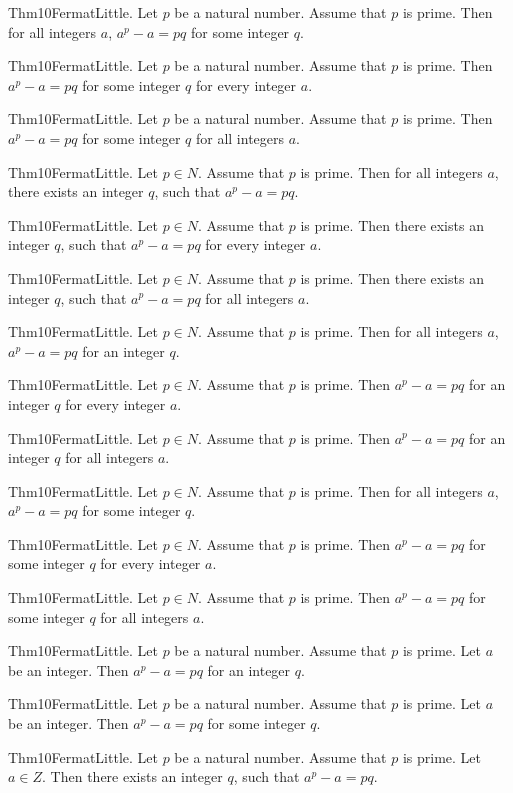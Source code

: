 \documentclass{article}
\begin{document}
Thm10FermatLittle. Let $p$ be a natural number. Assume that $p$ is prime. Then for all integers $a$, $a ^ {p}- a = p q$ for some integer $q$.

Thm10FermatLittle. Let $p$ be a natural number. Assume that $p$ is prime. Then $a ^ {p}- a = p q$ for some integer $q$ for every integer $a$.

Thm10FermatLittle. Let $p$ be a natural number. Assume that $p$ is prime. Then $a ^ {p}- a = p q$ for some integer $q$ for all integers $a$.

Thm10FermatLittle. Let $p \in N$. Assume that $p$ is prime. Then for all integers $a$, there exists an integer $q$, such that $a ^ {p}- a = p q$.

Thm10FermatLittle. Let $p \in N$. Assume that $p$ is prime. Then there exists an integer $q$, such that $a ^ {p}- a = p q$ for every integer $a$.

Thm10FermatLittle. Let $p \in N$. Assume that $p$ is prime. Then there exists an integer $q$, such that $a ^ {p}- a = p q$ for all integers $a$.

Thm10FermatLittle. Let $p \in N$. Assume that $p$ is prime. Then for all integers $a$, $a ^ {p}- a = p q$ for an integer $q$.

Thm10FermatLittle. Let $p \in N$. Assume that $p$ is prime. Then $a ^ {p}- a = p q$ for an integer $q$ for every integer $a$.

Thm10FermatLittle. Let $p \in N$. Assume that $p$ is prime. Then $a ^ {p}- a = p q$ for an integer $q$ for all integers $a$.

Thm10FermatLittle. Let $p \in N$. Assume that $p$ is prime. Then for all integers $a$, $a ^ {p}- a = p q$ for some integer $q$.

Thm10FermatLittle. Let $p \in N$. Assume that $p$ is prime. Then $a ^ {p}- a = p q$ for some integer $q$ for every integer $a$.

Thm10FermatLittle. Let $p \in N$. Assume that $p$ is prime. Then $a ^ {p}- a = p q$ for some integer $q$ for all integers $a$.

Thm10FermatLittle. Let $p$ be a natural number. Assume that $p$ is prime. Let $a$ be an integer. Then $a ^ {p}- a = p q$ for an integer $q$.

Thm10FermatLittle. Let $p$ be a natural number. Assume that $p$ is prime. Let $a$ be an integer. Then $a ^ {p}- a = p q$ for some integer $q$.

Thm10FermatLittle. Let $p$ be a natural number. Assume that $p$ is prime. Let $a \in Z$. Then there exists an integer $q$, such that $a ^ {p}- a = p q$.
\end{document}
